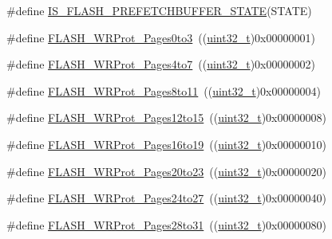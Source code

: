 \begin{DoxyCompactItemize}
\item 
\#define \hyperlink{group___prefetch___buffer___enable___disable_ga5fd6932c4f4e157a1d6e73d433df092f}{I\+S\+\_\+\+F\+L\+A\+S\+H\+\_\+\+P\+R\+E\+F\+E\+T\+C\+H\+B\+U\+F\+F\+E\+R\+\_\+\+S\+T\+A\+TE}(S\+T\+A\+TE)
\item 
\#define \hyperlink{group___option___bytes___write___protection_gac5c6f6155e4ebae0978a3d2a0d991e68}{F\+L\+A\+S\+H\+\_\+\+W\+R\+Prot\+\_\+\+Pages0to3}~((\hyperlink{_p_e___types_8h_a33594304e786b158f3fb30289278f5af}{uint32\+\_\+t})0x00000001)
\item 
\#define \hyperlink{group___option___bytes___write___protection_ga1b33c4de30c55331e7e60c0795c824ad}{F\+L\+A\+S\+H\+\_\+\+W\+R\+Prot\+\_\+\+Pages4to7}~((\hyperlink{_p_e___types_8h_a33594304e786b158f3fb30289278f5af}{uint32\+\_\+t})0x00000002)
\item 
\#define \hyperlink{group___option___bytes___write___protection_ga7eca7a8b11accdd6dadf3445847e1a57}{F\+L\+A\+S\+H\+\_\+\+W\+R\+Prot\+\_\+\+Pages8to11}~((\hyperlink{_p_e___types_8h_a33594304e786b158f3fb30289278f5af}{uint32\+\_\+t})0x00000004)
\item 
\#define \hyperlink{group___option___bytes___write___protection_gaa02b9439f75982e2e1c14f8af9a8c091}{F\+L\+A\+S\+H\+\_\+\+W\+R\+Prot\+\_\+\+Pages12to15}~((\hyperlink{_p_e___types_8h_a33594304e786b158f3fb30289278f5af}{uint32\+\_\+t})0x00000008)
\item 
\#define \hyperlink{group___option___bytes___write___protection_gaa589ce30909c3a9a0bffc8a59b6013fb}{F\+L\+A\+S\+H\+\_\+\+W\+R\+Prot\+\_\+\+Pages16to19}~((\hyperlink{_p_e___types_8h_a33594304e786b158f3fb30289278f5af}{uint32\+\_\+t})0x00000010)
\item 
\#define \hyperlink{group___option___bytes___write___protection_ga537e0f85899e13ca2ed93455e537d950}{F\+L\+A\+S\+H\+\_\+\+W\+R\+Prot\+\_\+\+Pages20to23}~((\hyperlink{_p_e___types_8h_a33594304e786b158f3fb30289278f5af}{uint32\+\_\+t})0x00000020)
\item 
\#define \hyperlink{group___option___bytes___write___protection_ga1d6b94b48e0dd21949139267b90a08ef}{F\+L\+A\+S\+H\+\_\+\+W\+R\+Prot\+\_\+\+Pages24to27}~((\hyperlink{_p_e___types_8h_a33594304e786b158f3fb30289278f5af}{uint32\+\_\+t})0x00000040)
\item 
\#define \hyperlink{group___option___bytes___write___protection_ga800860d071cfb40b1b0e94111a0cb549}{F\+L\+A\+S\+H\+\_\+\+W\+R\+Prot\+\_\+\+Pages28to31}~((\hyperlink{_p_e___types_8h_a33594304e786b158f3fb30289278f5af}{uint32\+\_\+t})0x00000080)
\item 

\end{DoxyCompactItemize}
